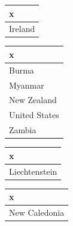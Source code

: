 \documentclass[]{article}
\newenvironment{Shaded}{\begin{snugshade}}{\end{snugshade}}
\newcommand{\ControlFlowTok}[1]{\textcolor[rgb]{0.13,0.29,0.53}{\textbf{#1}}}
\newcommand{\DecValTok}[1]{\textcolor[rgb]{0.00,0.00,0.81}{#1}}
\newcommand{\KeywordTok}[1]{\textcolor[rgb]{0.13,0.29,0.53}{\textbf{#1}}}
\newcommand{\NormalTok}[1]{#1}
\newcommand{\OperatorTok}[1]{\textcolor[rgb]{0.81,0.36,0.00}{\textbf{#1}}}
\newcommand{\StringTok}[1]{\textcolor[rgb]{0.31,0.60,0.02}{#1}}
\begin{document}
\begin{table}
\begin{tabular}[t]{l}
\hline
\end{tabular}
\centering
\begin{tabular}[t]{l}
\hline
x\\
\hline
Ireland\\
\hline
\end{tabular}
\centering
\begin{tabular}[t]{l}
\hline
x\\
\hline
Burma\\
\hline
Myanmar\\
\hline
New Zealand\\
\hline
United States\\
\hline
Zambia\\
\hline
\end{tabular}
\centering
\begin{tabular}[t]{l}
\hline
x\\
\hline
Liechtenstein\\
\hline
\end{tabular}
\centering
\begin{tabular}[t]{l}
\hline
x\\
\hline
New Caledonia\\
\hline
\end{tabular}
\end{table}

\begin{Shaded}
\end{Shaded}
\end{document}
